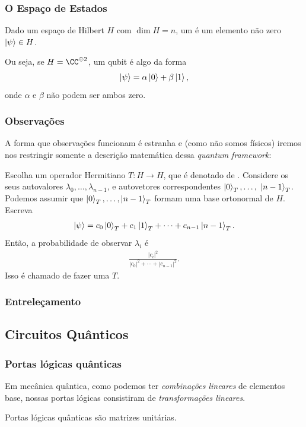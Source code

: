 \documentclass[11pt]{scrartcl}
\numberwithin{example}{section}
\begin{document}
\subsubsection{O Espaço de Estados}

\begin{definition}
  Dado um espaço de Hilbert $H$ com $\dim H = n$, um  é um elemento não zero $\ket \psi \in H$.   
\end{definition}

Ou seja, se $H = \CC^{\oplus 2}$, um qubit é algo da forma
\begin{align*}
    \ket \psi = \alpha \ket 0 + \beta \ket 1,
\end{align*}
onde $\alpha$ e $\beta$ não podem ser ambos zero. 

\subsubsection{Observações}

A forma que observações funcionam é estranha e (como não somos físicos) iremos nos restringir somente a descrição matemática dessa \textit{quantum framework}:

\begin{itemize}
  \ii Escolha um operador Hermitiano $T:H \to H$, que é denotado de .
  \ii Considere os seus autovalores $\lambda_0, \dots, \lambda_{n-1}$, e autovetores correspondentes $\ket 0_T, \dots,$ $\ket {n-1}_T$. Podemos assumir que $\ket 0_T,\dots,\ket{n-1}_T$ formam uma base ortonormal de $H$.
  \ii Escreva 
  \begin{align*}
    \ket \psi = c_0 \ket 0_T + c_1 \ket 1_T + \cdots + c_{n-1}\ket{n-1}_T.
  \end{align*}
  \ii Então, a probabilidade de observar $\lambda_i$ é 
  \begin{align*}
    \frac {|c_i|^2}{|c_0|^2 + \cdots + |c_{n-1}|^2}.
  \end{align*}
  Isso é chamado de fazer uma  $T$.
\end{itemize}

\subsubsection{Entreleçamento}

\subsection{Circuitos Quânticos}

\subsubsection{Portas lógicas quânticas}

Em mecânica quântica, como podemos ter \textit{combinações lineares} de elementos base, nossas portas lógicas consistiram de \textit{transformações lineares}. 

\begin{definition}
    Portas lógicas quânticas são matrizes unitárias. 
\end{definition}
\end{document}
